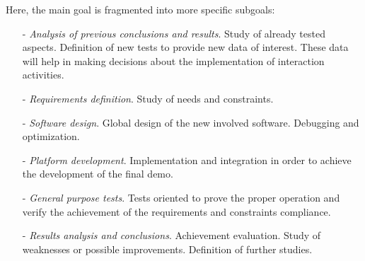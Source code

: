 \documentclass{acm_proc_article-sp}
\begin{document}
Here, the main goal is fragmented into more specific subgoals:

\begin{itemize}
  \item[-] \textit{Analysis of previous conclusions and results}. Study of already tested aspects. Definition of new tests to provide new data of interest. These data will help in making decisions about the implementation of interaction activities. 
  \item[-] \textit{Requirements definition}. Study of needs and constraints.
  \item[-] \textit{Software design}. Global design of the new involved software. Debugging and optimization.  
  \item[-] \textit{Platform development}. Implementation and integration in order to achieve the development of the final demo. 
  \item[-] \textit{General purpose tests}. Tests oriented to prove the proper operation and verify
the achievement of the requirements and constraints compliance.
  \item[-] \textit{Results analysis and conclusions}. Achievement evaluation. Study of weaknesses or possible improvements. Definition of further studies.
\end{itemize}
\end{document}
